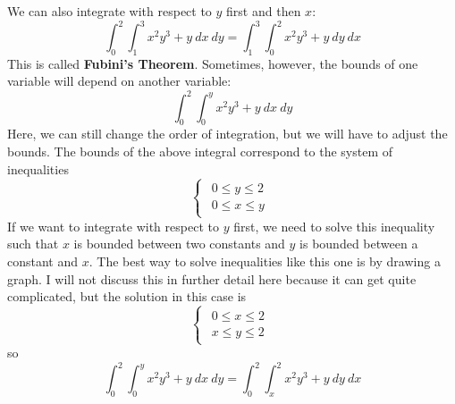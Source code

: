 We can also integrate with respect to $y$ first and then $x$:
\begin{equation*}
    \int_0^2 \int_1^3 x^2 y^3 + y\ dx\ dy = \int_1^3 \int_0^2  x^2 y^3 + y\ dy\ dx
\end{equation*}
This is called \textbf{Fubini's Theorem}. Sometimes, however, the bounds of one variable will 
depend on another variable:
\begin{equation*}
    \int_0^2 \int_0^y x^2 y^3 + y\ dx\ dy
\end{equation*}
Here, we can still change the order of integration, but we will have to adjust the bounds. The 
bounds of the above integral correspond to the system of inequalities
\begin{equation*}
    \begin{cases}
        \begin{aligned}
            0 \leq y \leq 2 \\
            0 \leq x \leq y 
        \end{aligned}
    \end{cases}
\end{equation*}
If we want to integrate with respect to $y$ first, we need to solve this inequality such that $x$ 
is bounded between two constants and $y$ is bounded between a constant and $x$. 
The best way to solve inequalities like this one is by drawing a graph. 
I will not discuss this in further detail here because it can get quite complicated, 
but the solution in this case is
\begin{equation*}
    \begin{cases}
        \begin{aligned}
            0 \leq x \leq 2 \\
            x \leq y \leq 2 
        \end{aligned}
    \end{cases}
\end{equation*}
so 
\begin{equation*}
    \int_0^2 \int_0^y x^2 y^3 + y\ dx\ dy = \int_0^2 \int_x^2 x^2 y^3 + y\ dy\ dx
\end{equation*}